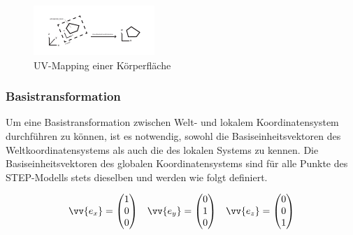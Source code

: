 \begin{figure}[h]
	\centering
	
	\includegraphics[width=\linewidth]{img/uvwmapping.pdf}
	
	\caption{UV-Mapping einer Körperfläche}
	\label{fig:uvwmapping}
	
\end{figure}
 
\subsubsection{Basistransformation}
\label{sec:basetransform}


Um eine Basistransformation zwischen Welt- und lokalem Koordinatensystem durchführen zu können, ist es notwendig, sowohl die Basiseinheitsvektoren des Weltkoordinatensystems als auch die des lokalen Systems zu kennen. Die Basiseinheitsvektoren des globalen Koordinatensystems sind für alle Punkte des STEP-Modells stets dieselben und werden wie folgt definiert.

\begin{singlespace}
	\begin{equation}
	\begin{aligned}
	\vv{e_{x}}=\begin{pmatrix}
	1 \\ 
	0 \\ 
	0
	\end{pmatrix}  
	&& 
	\vv{e_{y}}=\begin{pmatrix}
	0 \\ 
	1 \\ 
	0
	\end{pmatrix}  
	&& 
	\vv{e_{z}}=\begin{pmatrix}
	0 \\ 
	0 \\ 
	1
	\end{pmatrix} 
	\end{aligned}
	\end{equation}
\end{singlespace}

